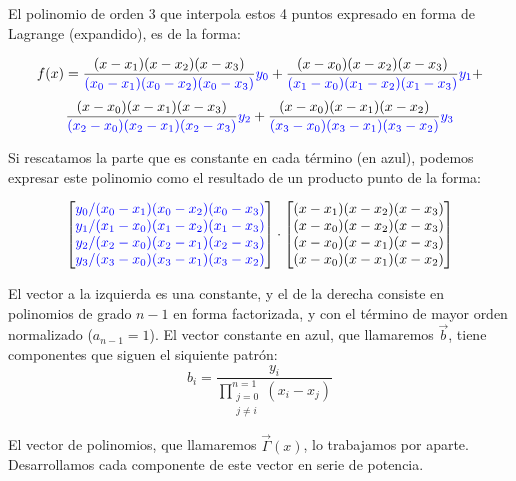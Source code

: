\documentclass[12pt]{article}
\begin{document}
El polinomio de orden $3$ que interpola estos 4 puntos expresado en forma de Lagrange (expandido), es de la forma:

\[ f(x) = \frac{(x-x_1)(x-x_2)(x-x_3)}{\color{blue}(x_0-x_1)(x_0-x_2)(x_0-x_3)} {\color{blue}y_0} + \frac{(x-x_0)(x-x_2)(x-x_3)}{\color{blue}(x_1-x_0)(x_1-x_2)(x_1-x_3)} {\color{blue}y_1} +\] \[ \frac{(x-x_0)(x-x_1)(x-x_3)}{\color{blue}(x_2-x_0)(x_2-x_1)(x_2-x_3)} {\color{blue}y_2} + \frac{(x-x_0)(x-x_1)(x-x_2)}{\color{blue}(x_3-x_0)(x_3-x_1)(x_3-x_2)} {\color{blue}y_3} \]

Si rescatamos la parte que es constante en cada t\'ermino (en azul), podemos expresar este polinomio como el resultado de un producto punto de la forma:

\[
\begin{bmatrix}
	\color{blue}
    y_0/(x_0-x_1)(x_0-x_2)(x_0-x_3) \\
    \color{blue}
    y_1/(x_1-x_0)(x_1-x_2)(x_1-x_3) \\
    \color{blue}
    y_2/(x_2-x_0)(x_2-x_1)(x_2-x_3) \\
    \color{blue}
    y_3/(x_3-x_0)(x_3-x_1)(x_3-x_2)
\end{bmatrix}
\cdot 
\begin{bmatrix}
    (x-x_1)(x-x_2)(x-x_3) \\
    (x-x_0)(x-x_2)(x-x_3) \\
    (x-x_0)(x-x_1)(x-x_3) \\
    (x-x_0)(x-x_1)(x-x_2)
\end{bmatrix}
\]

El vector a la izquierda es una constante, y el de la derecha consiste en polinomios de grado $n-1$ en forma factorizada, y con el t\'ermino de mayor orden normalizado ($a_{n-1} = 1$). El vector constante en azul, que llamaremos $\vec{b}$, tiene componentes que siguen el siquiente patr\'on: \[ b_i = \frac{y_i}{\prod\limits_{\substack{j=0 \\ j\neq i}}^{n=1} (x_i-x_j)} \]

El vector de polinomios, que llamaremos $\vec{\Gamma}(x)$, lo trabajamos por aparte. Desarrollamos cada componente de este vector en serie de potencia.
\end{document}

